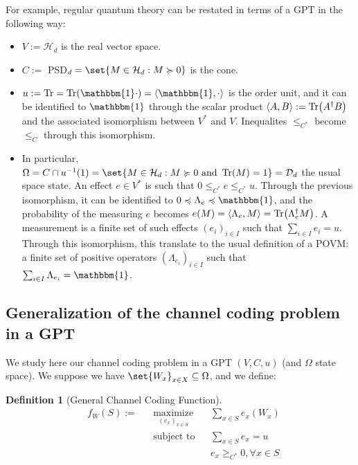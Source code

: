 \documentclass{article}
\theoremstyle{definition}
\newtheorem{defi}[theo]{Definition}
\theoremstyle{remark}
\DeclareMathOperator{\maxi}{\text{maximize}}
\DeclareMathOperator{\st}{\text{subject to}}
\begin{document}
For example, regular quantum theory can be restated in terms of a GPT in the following way:
\begin{itemize}
\item $V := \mathcal{H}_d$ is the real vector space.
\item $C := $ PSD$_d = \set{M \in \mathcal{H}_d : M \succcurlyeq 0}$ is the cone.
\item $u := \Tr = \Tr(\mathbbm{1} \cdot) = \langle \mathbbm{1}, \cdot \rangle$ is the order unit, and it can be identified to $\mathbbm{1}$ through the scalar product $\langle A, B \rangle := \Tr(A^{\dagger}B)$ and the associated isomorphism between $V^*$ and $V$. Inequalites $\leq_{C^*}$ become $\leq_C$ through this isomorphism.
\item In particular, $\Omega = C \cap u^{-1}(1) = \set{M \in \mathcal{H}_d : M \succcurlyeq 0 \text{ and } \Tr(M) = 1} = \mathcal{D}_d$ the usual space state. An effect $e \in V^*$ is such that $0 \leq_{C^*} e \leq_{C^*} u$. Through the previous isomorphism, it can be identified to $0 \preccurlyeq \Lambda_e \preccurlyeq \mathbbm{1}$, and the probability of the measuring $e$ becomes $e(M) = \langle \Lambda_e, M \rangle = \Tr(\Lambda_e^{\dagger}M)$. A measurement is a finite set of such effects $(e_i)_{i \in I}$ such that $\sum_{i \in I} e_i = u$. Through this isomorphism, this translate to the usual definition of a POVM: a finite set of positive operators $(\Lambda_{e_i})_{i \in I}$ such that $\sum_{i \in I} \Lambda_{e_i} = \mathbbm{1}$.
\end{itemize}

\subsection{Generalization of the channel coding problem in a GPT}
We study here our channel coding problem in a GPT $(V,C,u)$ (and $\Omega$ state space). We suppose we have $\set{W_x}_{x \in X} \subseteq \Omega$, and we define:
\begin{defi}[General Channel Coding Function]
  \begin{equation}
    \begin{aligned}
      &f_W(S) :=&& \underset{(e_x)_{x \in S}}{\maxi} &&\underset{x \in S}{\sum} e_x(W_x) \\
      &&& \st && \underset{x \in S}{\sum} e_x = u \\
      &&&&& e_x \geq_{C^*} 0, \forall x \in S
    \end{aligned}
  \end{equation}
\end{defi}
\end{document}
